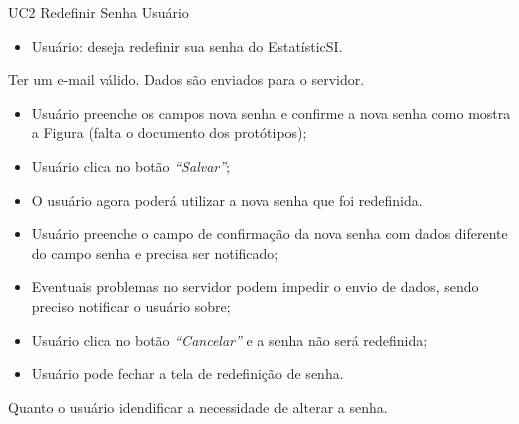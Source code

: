 \casoDeUso
{UC2}
{Redefinir Senha}
{Usuário}
{
\begin{itemize}
	\item Usuário: deseja redefinir sua senha do EstatísticSI.	
\end{itemize}

}
{Ter um e-mail válido.}
{Dados são enviados para o servidor.}
{
\begin{itemize}
	\item Usuário preenche os campos nova senha e confirme a nova senha como mostra a Figura (falta o documento dos protótipos); 
	\item Usuário clica no botão \textit{“Salvar”};	
	\item O usuário agora poderá utilizar a nova senha que foi redefinida.
			
\end{itemize}
}
{
\begin{itemize}
	\item Usuário preenche o campo de confirmação da nova senha com dados diferente do campo senha e precisa ser notificado;
	\item Eventuais problemas no servidor podem impedir o envio de dados, sendo preciso notificar o usuário sobre;
	\item Usuário clica no botão \textit{“Cancelar”} e a senha não será redefinida;
	\item Usuário pode fechar a tela de redefinição de senha.
	
\end{itemize}
}
{Quanto o usuário idendificar a necessidade de alterar a senha.}
{

}


